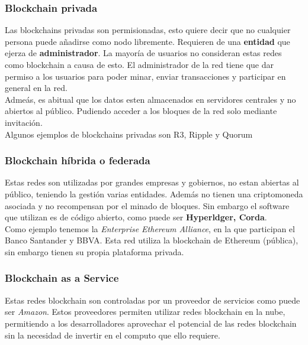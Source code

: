 \subsubsection{Blockchain privada}

Las blockchains privadas son permisionadas, esto quiere decir que no cualquier persona puede añadirse como nodo libremente. Requieren de una \textbf{entidad} que ejerza de \textbf{administrador}. La mayoría de usuarios no consideran estas redes como blockchain a causa de esto. El administrador de la red tiene que dar permiso a los usuarios para poder minar, enviar transacciones y participar en general en la red. \\

Admeás, es abitual que los datos esten almacenados en servidores centrales y no abiertos al público. Pudiendo acceder a los bloques de la red solo mediante invitación. \\

Algunos ejemplos de blockchains privadas son R3\cite{webR3}, Ripple\cite{webRipple} y Quorum\cite{webQuorum}

\subsubsection{Blockchain híbrida o federada}

Estas redes son utilizadas por grandes empresas y gobiernos, no estan abiertas al público, teniendo la gestión varias entidades. Además no tienen una criptomoneda asociada y no recompensan por el minado de bloques. Sin embargo el software que utilizan es de código abierto, como puede ser \textbf{Hyperldger, Corda}\cite{webHpyer, webCorda}. \\

Como ejemplo tenemos la \emph{Enterprise Ethereum Alliance}, en la que participan el Banco Santander y BBVA. Esta red utiliza la blockchain de Ethereum (pública), sin embargo tienen su propia plataforma privada.

\subsubsection{Blockchain as a Service}

Estas redes blockchain son controladas por un proveedor de servicios como puede ser \emph{Amazon}. Estos proveedores permiten utilizar redes blockchain en la nube, permitiendo a los desarrolladores aprovechar el potencial de las redes blockchain sin la necesidad de invertir en el computo que ello requiere.

